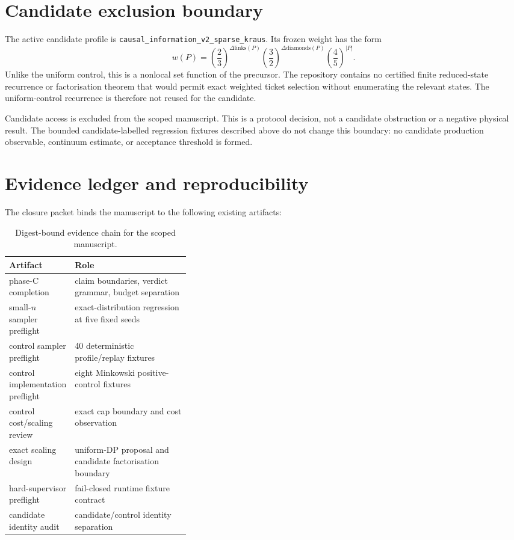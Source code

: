 \documentclass[11pt]{article}
\newcommand{\code}[1]{\texttt{#1}}
\begin{document}
\section{Candidate exclusion boundary}

The active candidate profile is
\code{causal\_information\_v2\_sparse\_kraus}.  Its frozen weight has the
form
\[
 w(P)=\left(\frac{2}{3}\right)^{\Delta\mathrm{links}(P)}
       \left(\frac{3}{2}\right)^{\Delta\mathrm{diamonds}(P)}
       \left(\frac{4}{5}\right)^{|P|}.
\]
Unlike the uniform control, this is a nonlocal set function of the precursor.
The repository contains no certified finite reduced-state recurrence or
factorisation theorem that would permit exact weighted ticket selection without
enumerating the relevant states.  The uniform-control recurrence is therefore
not reused for the candidate.

Candidate access is excluded from the scoped manuscript.  This is a protocol
decision, not a candidate obstruction or a negative physical result.  The
bounded candidate-labelled regression fixtures described above do not change
this boundary: no candidate production observable, continuum estimate, or
acceptance threshold is formed.

\section{Evidence ledger and reproducibility}

The closure packet binds the manuscript to the following existing artifacts:

\begin{table}[h]
\centering
\small
\begin{tabularx}{\linewidth}{>{\raggedright\arraybackslash}p{0.35\linewidth} X}
\toprule
Artifact & Role \\
\midrule
phase-C completion & claim boundaries, verdict grammar, budget separation \\
small-$n$ sampler preflight & exact-distribution regression at five fixed seeds \\
control sampler preflight & 40 deterministic profile/replay fixtures \\
control implementation preflight & eight Minkowski positive-control fixtures \\
control cost/scaling review & exact cap boundary and cost observation \\
exact scaling design & uniform-DP proposal and candidate factorisation boundary \\
hard-supervisor preflight & fail-closed runtime fixture contract \\
candidate identity audit & candidate/control identity separation \\
\bottomrule
\end{tabularx}
\caption{Digest-bound evidence chain for the scoped manuscript.}
\end{table}
\end{document}
